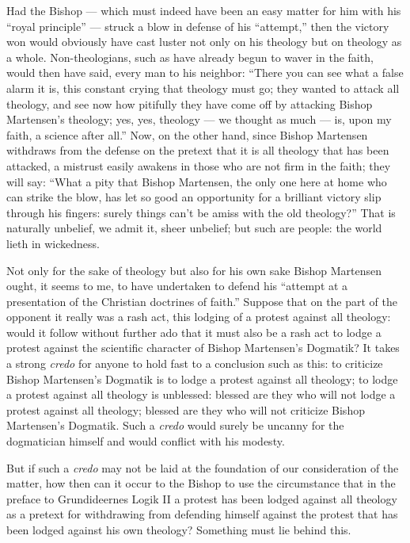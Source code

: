 \documentclass[12pt]{book}
\newcommand{\opage}[1]{\marginnote{\footnotesize\textit{[#1]}}}
\begin{document}
Had the Bishop --- which must indeed have been an easy matter for him with his ``royal principle'' --- struck a blow in defense of his ``attempt,'' then the victory won would obviously have cast luster not only on his theology but on theology as a whole. Non-theologians, such as have already begun to waver in the faith, would then have said, every man to his neighbor: ``There you can see what a false alarm it is, this constant crying that theology must go; they wanted to attack all theology, and see now how pitifully they have come off by attacking Bishop Martensen's theology; yes, yes, theology --- we thought as much --- is, upon my faith, a science after all.'' Now, on the other hand, since Bishop Martensen withdraws from the defense on
\opage{80}\setcounter{footnote}{0}%
the pretext that it is all theology that has been attacked, a mistrust easily awakens in those who are not firm in the faith; they will say: ``What a pity that Bishop Martensen, the only one here at home who can strike the blow, has let so good an opportunity for a brilliant victory slip through his fingers: surely things can't be amiss with the old theology?'' That is naturally unbelief, we admit it, sheer unbelief; but such are people: the world lieth in wickedness.

Not only for the sake of theology but also for his own sake Bishop Martensen ought, it seems to me, to have undertaken to defend his ``attempt at a presentation of the Christian doctrines of faith.'' Suppose that on the part of the opponent it really was a rash act, this lodging of a protest against all theology: would it follow without further ado that it must also be a rash act to lodge a protest against the scientific character of Bishop Martensen's Dogmatik? It takes a strong \textit{credo} for anyone to hold fast to a conclusion such as this: to criticize Bishop Martensen's Dogmatik is to lodge a protest against all theology; to lodge a protest against all theology is unblessed: blessed are they who will not lodge a protest against all theology; blessed are they who will not criticize Bishop Martensen's Dogmatik. Such a \textit{credo} would surely be uncanny for the dogmatician himself and would conflict with his modesty.

But if such a \textit{credo} may not be laid at the foundation of our consideration of the matter, how then can it occur to the Bishop to use the circumstance that in the preface to Grundideernes Logik II a protest has been lodged against all theology as a pretext for withdrawing from defending himself against the protest that has been lodged against his own theology? Something must lie behind this.
\end{document}
